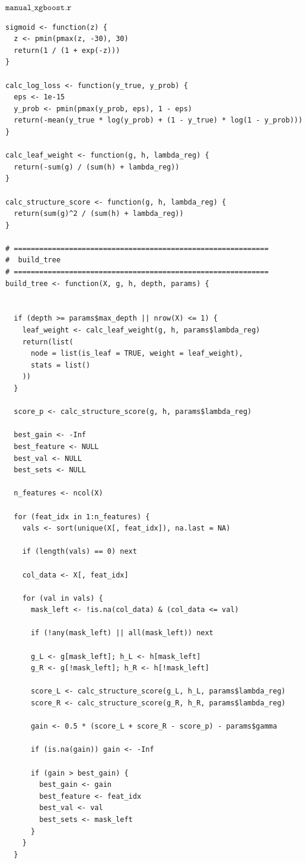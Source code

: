 \documentclass[11pt, a4paper]{article}
\begin{document}
$\texttt{manual\_xgboost.r}$
\begin{verbatim}
sigmoid <- function(z) {
  z <- pmin(pmax(z, -30), 30)
  return(1 / (1 + exp(-z)))
}

calc_log_loss <- function(y_true, y_prob) {
  eps <- 1e-15
  y_prob <- pmin(pmax(y_prob, eps), 1 - eps)
  return(-mean(y_true * log(y_prob) + (1 - y_true) * log(1 - y_prob)))
}

calc_leaf_weight <- function(g, h, lambda_reg) {
  return(-sum(g) / (sum(h) + lambda_reg))
}

calc_structure_score <- function(g, h, lambda_reg) {
  return(sum(g)^2 / (sum(h) + lambda_reg))
}

# ============================================================
#  build_tree
# ============================================================
build_tree <- function(X, g, h, depth, params) {
  

  if (depth >= params$max_depth || nrow(X) <= 1) {
    leaf_weight <- calc_leaf_weight(g, h, params$lambda_reg)
    return(list(
      node = list(is_leaf = TRUE, weight = leaf_weight),
      stats = list()
    ))
  }
  
  score_p <- calc_structure_score(g, h, params$lambda_reg)
  
  best_gain <- -Inf
  best_feature <- NULL
  best_val <- NULL
  best_sets <- NULL
  
  n_features <- ncol(X)
  
  for (feat_idx in 1:n_features) {
    vals <- sort(unique(X[, feat_idx]), na.last = NA)
    
    if (length(vals) == 0) next
    
    col_data <- X[, feat_idx]
    
    for (val in vals) {
      mask_left <- !is.na(col_data) & (col_data <= val)
      
      if (!any(mask_left) || all(mask_left)) next
      
      g_L <- g[mask_left]; h_L <- h[mask_left]
      g_R <- g[!mask_left]; h_R <- h[!mask_left]
      
      score_L <- calc_structure_score(g_L, h_L, params$lambda_reg)
      score_R <- calc_structure_score(g_R, h_R, params$lambda_reg)
      
      gain <- 0.5 * (score_L + score_R - score_p) - params$gamma
      
      if (is.na(gain)) gain <- -Inf
      
      if (gain > best_gain) {
        best_gain <- gain
        best_feature <- feat_idx
        best_val <- val
        best_sets <- mask_left 
      }
    }
  }
  

\end{verbatim}
\end{document}
